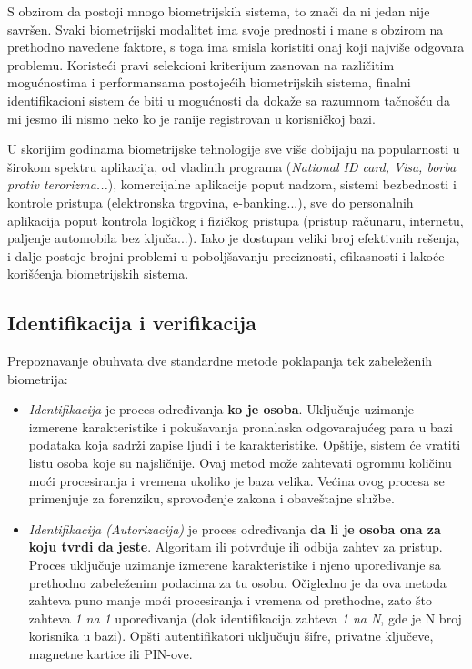 \documentclass[11pt, a4paper]{article}
\begin{document}
S obzirom da postoji mnogo biometrijskih sistema, to znači da ni jedan nije savršen. Svaki biometrijski modalitet ima svoje prednosti i mane s obzirom na prethodno navedene faktore, s toga ima smisla koristiti onaj koji najviše odgovara problemu. Koristeći pravi selekcioni kriterijum zasnovan na različitim mogućnostima i performansama postojećih biometrijskih sistema, finalni identifikacioni sistem će biti u mogućnosti da dokaže sa razumnom tačnošću da mi jesmo ili nismo neko ko je ranije registrovan u korisničkoj bazi.

U skorijim godinama biometrijske tehnologije sve više dobijaju na popularnosti u širokom spektru aplikacija, od vladinih programa (\textit{National ID card, Visa, borba protiv terorizma...}), komercijalne aplikacije poput nadzora, sistemi bezbednosti i kontrole pristupa (elektronska trgovina, e-banking...), sve do personalnih aplikacija poput kontrola logičkog i fizičkog pristupa (pristup računaru, internetu, paljenje automobila bez ključa...). Iako je dostupan veliki broj efektivnih rešenja, i dalje postoje brojni problemi u poboljšavanju preciznosti, efikasnosti i lakoće korišćenja biometrijskih sistema.
\newpage
\subsection{Identifikacija i verifikacija}

Prepoznavanje obuhvata dve standardne metode poklapanja tek zabeleženih biometrija:
\begin{itemize}
    \item \textit{Identifikacija} je proces određivanja \textbf{ko je osoba}. Uključuje uzimanje izmerene karakteristike i pokušavanja pronalaska odgovarajućeg para u bazi podataka koja sadrži zapise ljudi i te karakteristike. Opštije, sistem će vratiti listu osoba koje su najsličnije. Ovaj metod može zahtevati ogromnu količinu moći procesiranja i vremena ukoliko je baza velika. Većina ovog procesa se primenjuje za forenziku, sprovođenje zakona i obaveštajne službe.
    \item \textit{Identifikacija (Autorizacija)} je  proces određivanja \textbf{da li je osoba ona za koju tvrdi da jeste}. Algoritam ili potvrđuje ili odbija zahtev za pristup. Proces uključuje uzimanje izmerene karakteristike i njeno upoređivanje sa prethodno zabeleženim podacima za tu osobu. Očigledno je da ova metoda zahteva puno manje moći procesiranja i vremena od prethodne, zato što zahteva  \textit{1 na 1} upoređivanja (dok identifikacija zahteva \textit{1 na N}, gde je N broj korisnika u bazi). Opšti autentifikatori uključuju šifre, privatne ključeve, magnetne kartice ili PIN-ove.
\end{itemize}
\end{document}
